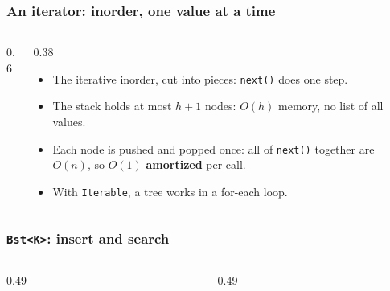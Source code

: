 \documentclass[aspectratio=169,10pt,compress]{beamer}
\begin{document}
\begin{frame}[t,fragile] \frametitle{An iterator: inorder, one value at a time}
  \begin{columns}[T]
    \begin{column}{0.6\textwidth}
    \end{column}
    \begin{column}{0.38\textwidth}
      \begin{itemize}\small
        \item The iterative inorder, cut into pieces: \texttt{next()} does one step.
        \item The stack holds at most $h + 1$ nodes: $O(h)$ memory, no list of all values.
        \item Each node is pushed and popped once: all of \texttt{next()} together are $O(n)$, so $O(1)$ \textbf{amortized} per call.
        \item With \texttt{Iterable}, a tree works in a for-each loop.
      \end{itemize}
    \end{column}
  \end{columns}
\end{frame}





\begin{frame}[t,fragile] \frametitle{\texttt{Bst<K>}: insert and search}
  \begin{columns}[T]
    \begin{column}{0.49\textwidth}
    \end{column}
    \begin{column}{0.49\textwidth}
    \end{column}
  \end{columns}
\end{frame}
\end{document}
